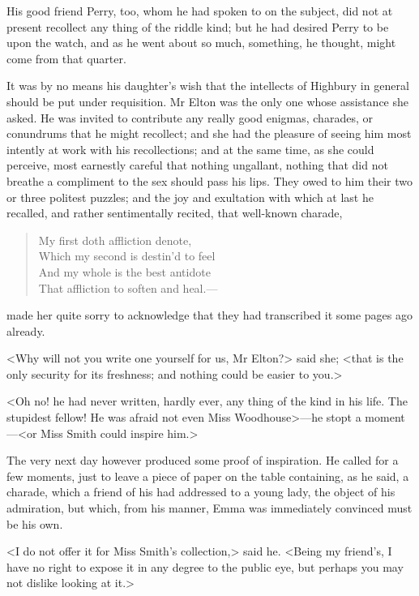 His good friend Perry, too, whom he had spoken to on the subject, did not at present recollect any thing of the riddle kind; but he had desired Perry to be upon the watch, and as he went about so much, something, he thought, might come from that quarter.

It was by no means his daughter's wish that the intellects of Highbury in general should be put under requisition. Mr Elton was the only one whose assistance she asked. He was invited to contribute any really good enigmas, charades, or conundrums that he might recollect; and she had the pleasure of seeing him most intently at work with his recollections; and at the same time, as she could perceive, most earnestly careful that nothing ungallant, nothing that did not breathe a compliment to the sex should pass his lips. They owed to him their two or three politest puzzles; and the joy and exultation with which at last he recalled, and rather sentimentally recited, that well-known charade,

\begin{verse}
\begin{altverse}
My first doth affliction denote,\\
    Which my second is destin'd to feel\\
And my whole is the best antidote\\
    That affliction to soften and heal.—\\
\end{altverse}
\end{verse}

made her quite sorry to acknowledge that they had transcribed it some pages ago already.

<Why will not you write one yourself for us, Mr Elton?> said she; <that is the only security for its freshness; and nothing could be easier to you.>

<Oh no! he had never written, hardly ever, any thing of the kind in his life. The stupidest fellow! He was afraid not even Miss Woodhouse>—he stopt a moment—<or Miss Smith could inspire him.>

The very next day however produced some proof of inspiration. He called for a few moments, just to leave a piece of paper on the table containing, as he said, a charade, which a friend of his had addressed to a young lady, the object of his admiration, but which, from his manner, Emma was immediately convinced must be his own.

<I do not offer it for Miss Smith's collection,> said he. <Being my friend's, I have no right to expose it in any degree to the public eye, but perhaps you may not dislike looking at it.>

